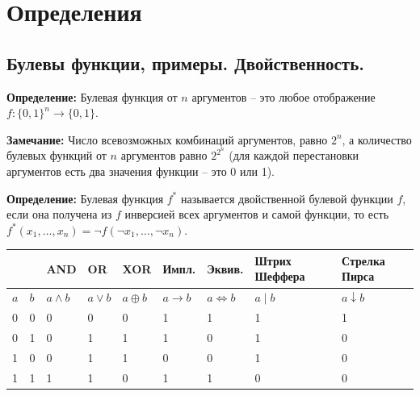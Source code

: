 \section{Определения}

\subsection{Булевы функции, примеры. Двойственность.}
\textbf{Определение:} Булевая функция от $n$ аргументов -- это любое отображение $f: \{0,1\}^n\to \{0,1\}$. 

\textbf{Замечание:} Число всевозможных комбинаций аргументов, равно $2^n$, а количество булевых функций от $n$ аргументов равно $2^{2^n}$ (для каждой перестановки аргументов есть два значения функции -- это 0 или 1).

\par \textbf{Определение:} Булевая функция $f^*$ называется двойственной булевой функции $f$, если она получена из $f$ инверсией всех аргументов и самой функции, то есть $f^*(x_1,\ldots,x_n)=\neg f(\neg x_1,\ldots,\neg x_n)$.
\hfill \break

\begin{tabular}{| l | l | l | l | l | l | l | l | l |}
    \hline
    & & AND & OR & XOR & Импл. & Эквив. & Штрих Шеффера & Стрелка Пирса\\ 
    \hline
    $a$ & $b$ & $a\land b$ & $a\lor b$ & $a\oplus b$ & $a\rightarrow b$ & $a\Leftrightarrow b$ & $a\;|\;b$ & $a\downarrow b$\\ 
    \hline
    0 & 0 & 0 & 0 & 0 & 1 & 1 & 1 & 1\\
    0 & 1 & 0 & 1 & 1 & 1 & 0 & 1 & 0\\
    1 & 0 & 0 & 1 & 1 & 0 & 0 & 1 & 0\\
    1 & 1 & 1 & 1 & 0 & 1 & 1 & 0 & 0\\
\hline
\end{tabular}
